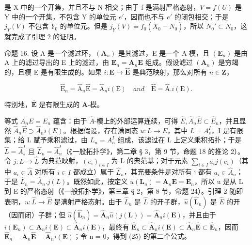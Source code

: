 是 X 中的一个开集，并且不与 N 相交；由于 f 是满射严格态射，\(V = f(U)\) 是 Y 中的一个开集，不包含 Y 的单位元 \(e'\)，因而也不与 \(e'\) 的闭包相交；于是 \(j_{Y}(V)\) 不包含 \(Y_{0}\) 的单位元。但是 \(j_{Y}(V) = f_{0}(X_{0} - \overline{N}_{0})\)，所以 \(N_{0}' \subset \overline{N}_{0}\)，这就完成了引理 2 的证明。

命题 16. 设 A 是一个滤过环，\((\mathbf{A}_n)\) 是其滤过，E 是一个 A-模，且 \((\mathbf{E}_n)\) 是由 A 上的滤过导出的 E 上的滤过，由 \(\mathbf{E}_n = \mathbf{A}_n\mathbf{E}\) 组成。假设滤过 \((\mathbf{A}_n)\) 是穷竭的，且模 E 是有限生成的。如果 \(i: \mathbf{E} \to \hat{\mathbf{E}}\) 是典范映射，那么对所有 \(n \in \mathbf{Z}\)，

\[
\hat {\mathrm{E}} _ {n} = \hat {\mathrm{A}} _ {n} \hat {\mathrm{E}} = \hat {\mathrm{A}} _ {n} i (\mathrm{E}) \quad a n d \quad \hat {\mathrm{E}} = \hat {\mathrm{A}}. i (\mathrm{E}).\tag{25}
\]

特别地，\(\hat{\mathbf{E}}\) 是有限生成的 \(\hat{\mathbf{A}}\)-模。

等式 \(A_{n}E = E_{n}\) 蕴含：由于 \(\hat{A}\)-模上的外部运算连续，可得 \(\hat{E}, \hat{A}_{n}\hat{E} \subset \hat{E}_{n}\)，并且显然 \(\hat{A}_{n}\hat{E} \supset \hat{A}_{n}i(E)\)。根据假设，存在满同态 \(u: L \to E\)，其中 \(L = A_{s}^{I}\)，I 是有限集；给 L 赋予乘积滤过，由 \(L_{n} = A_{n}^{I}\) 组成，该滤过在 L 上定义乘积拓扑；于是 \(\hat{L} = \hat{A}_{s}^{I}\) 且 \(\hat{L}_{n} = \hat{A}_{n}^{I}\)（《一般拓扑学》，第二章 § 3，第 9 节，命题 18 的推论 2）。令 \(j: L \to \hat{L}\) 为典范映射，\((e_{i})_{i \in I}\) 为 L 的典范基；对于元素 \(\sum_{i \in I} a_{i}j(e_{i})\)（其中 \(a_{i} \in \hat{A}\) 对所有 \(i \in I\) 都成立）属于 \(\hat{L}_{n}\)，其充要条件是对所有 i 都有 \(a_{i} \in \hat{A}_{n}\)；于是 \(\hat{L}_{n} = \hat{A}_{n}.j(L)\)。既然如此，按定义 \(u(\mathbf{L}_{n}) = \mathbf{A}_{n}\mathbf{E} = \mathbf{E}_{n}\)，所以 u 是从 L 到 E 的严格态射（《一般拓扑学》，第三章 § 2，第 8 节，命题 24）。引理 2 随即表明，\(\hat{u}: \hat{L} \to \hat{E}\) 是满射严格态射。由于 \(\hat{L}_{n}\) 是 \(\hat{L}\) 的开子群，\(\hat{u}(\hat{\mathbf{L}}_{n})\) 是 \(\hat{E}\) 的开（因而闭）子群；但 \(\hat{u}(\hat{\mathbf{L}}_{n}) = \hat{\mathbf{A}}_{n}\hat{u}(j(\mathbf{L})) = \hat{\mathbf{A}}_{n}i(\mathbf{E})\)，并且由于 \(i(\mathbf{E}_{n}) \subset \mathbf{A}_{n}i(\mathbf{E}) \subset \hat{\mathbf{A}}_{n}i(\mathbf{E})\)，最终有 \(\hat{\mathbf{E}}_{n} \subset \hat{\mathbf{A}}_{n}i(\mathbf{E}) \subset \hat{\mathbf{A}}_{n}\hat{\mathbf{E}} \subset \hat{\mathbf{E}}_{n}\)，因而 \(\hat{\mathbf{E}}_{n} = \hat{\mathbf{A}}_{n}\hat{\mathbf{E}} = \hat{\mathbf{A}}_{n}i(\mathbf{E})\)；令 n = 0，得到 (25) 的第二个公式。

